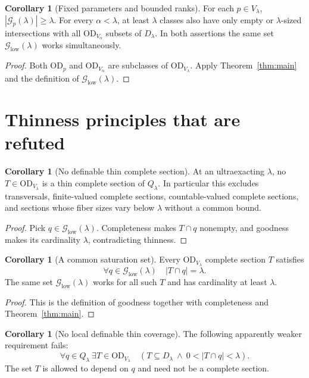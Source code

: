 \documentclass[11pt,letterpaper]{article}
\theoremstyle{definition}
\newtheorem{corollary}[definition]{Corollary}
\newcommand{\OD}{\mathrm{OD}}
\numberwithin{equation}{section}
\newcommand{\Good}{\mathcal G}
\begin{document}
\begin{corollary}[Fixed parameters and bounded ranks]\label{cor:bounded-params}
For each $p\in V_\lambda$, $|\Good_p(\lambda)|\ge\lambda$. For every
$\alpha<\lambda$, at least $\lambda$ classes also have only empty or
$\lambda$-sized intersections with all $\OD_{V_\alpha}$ subsets of
$D_\lambda$. In both assertions the same set
$\Good_{\mathrm{low}}(\lambda)$ works simultaneously.
\end{corollary}

\begin{proof}
Both $\OD_p$ and $\OD_{V_\alpha}$ are subclasses of
$\OD_{V_\lambda}$. Apply Theorem~\ref{thm:main} and the definition of
$\Good_{\mathrm{low}}(\lambda)$.
\end{proof}

\section{Thinness principles that are refuted}\label{sec:consequences}

\begin{corollary}[No definable thin complete section]\label{cor:thin}
At an ultraexacting $\lambda$, no $T\in\OD_{V_\lambda}$ is a thin complete
section of $Q_\lambda$. In particular this excludes transversals,
finite-valued complete sections, countable-valued complete sections, and
sections whose fiber sizes vary below $\lambda$ without a common bound.
\end{corollary}

\begin{proof}
Pick $q\in\Good_{\mathrm{low}}(\lambda)$. Completeness makes $T\cap q$
nonempty, and goodness makes its cardinality $\lambda$, contradicting
thinness.
\end{proof}

\begin{corollary}[A common saturation set]\label{cor:common}
Every $\OD_{V_\lambda}$ complete section $T$ satisfies
\[
      \forall q\in\Good_{\mathrm{low}}(\lambda)\quad |T\cap q|=\lambda.
\]
The same set $\Good_{\mathrm{low}}(\lambda)$ works for all such $T$ and has
cardinality at least $\lambda$.
\end{corollary}

\begin{proof}
This is the definition of goodness together with completeness and
Theorem~\ref{thm:main}.
\end{proof}

\begin{corollary}[No local definable thin coverage]\label{cor:local-thin}
The following apparently weaker requirement fails:
\[
 \forall q\in Q_\lambda\ \exists T\in\OD_{V_\lambda}\quad
       (T\subseteq D_\lambda\ \wedge\ 0<|T\cap q|<\lambda).
\]
The set $T$ is allowed to depend on $q$ and need not be a complete section.
\end{corollary}
\end{document}
